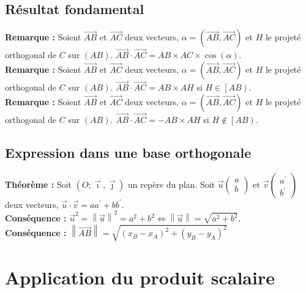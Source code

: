 \documentclass[a4paper,titlepage]{article}
\let\oldsection\section
\renewcommand\section{\clearpage\oldsection}
\begin{document}
    \subsection{Résultat fondamental}
        \textbf{Remarque :} Soient $\overrightarrow{AB}$ et $\overrightarrow{AC}$ deux vecteurs, $\alpha=\left(\overrightarrow{AB},\overrightarrow{AC}\right)$ et $H$ le projeté orthogonal de $C$ sur $\left(AB\right)$. $\overrightarrow{AB}\cdot\overrightarrow{AC}=AB\times AC\times\cos\left(\alpha\right)$.
        \\
        \textbf{Remarque :} Soient $\overrightarrow{AB}$ et $\overrightarrow{AC}$ deux vecteurs, $\alpha=\left(\overrightarrow{AB},\overrightarrow{AC}\right)$ et $H$ le projeté orthogonal de $C$ sur $\left(AB\right)$. $\overrightarrow{AB}\cdot\overrightarrow{AC}=AB\times AH$ si $H\in\left[AB\right)$.
        \\
        \textbf{Remarque :} Soient $\overrightarrow{AB}$ et $\overrightarrow{AC}$ deux vecteurs, $\alpha=\left(\overrightarrow{AB},\overrightarrow{AC}\right)$ et $H$ le projeté orthogonal de $C$ sur $\left(AB\right)$. $\overrightarrow{AB}\cdot\overrightarrow{AC}=-AB\times AH$ si $H\notin\left[AB\right)$.
    \subsection{Expression dans une base orthogonale}
        \textbf{Théorème :} Soit $\left(O;\vec{\imath},\vec{\jmath}\right)$ un repère du plan. Soit $\vec{u}\left(\begin{smallmatrix}a\\b\end{smallmatrix}\right)$ et $\vec{v}\left(\begin{smallmatrix}a^{\prime}\\b^{\prime}\end{smallmatrix}\right)$ deux vecteurs, $\vec{u}\cdot\vec{v}=aa^{\prime}+bb^{\prime}$.
        \\
        \textbf{Conséquence :} $\vec{u}^{2}=\left\|\vec{u}\right\|^{2}=a^{2}+b^{2}\Leftrightarrow\left\|\vec{u}\right\|=\sqrt{a^{2}+b^{2}}$.
        \\
        \textbf{Conséquence :} $\left\|\overrightarrow{AB}\right\|=\sqrt{\left(x_{B}-x_{A}\right)^{2}+\left(y_{B}-y_{A}\right)^{2}}$
\section{Application du produit scalaire}
\end{document}
